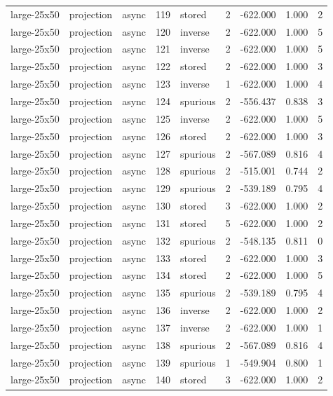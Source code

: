 \begin{tabular}{lllrlrrrr}
large-25x50 & projection & async & 119 & stored & 2 & -622.000 & 1.000 & 2 \\
large-25x50 & projection & async & 120 & inverse & 2 & -622.000 & 1.000 & 5 \\
large-25x50 & projection & async & 121 & inverse & 2 & -622.000 & 1.000 & 5 \\
large-25x50 & projection & async & 122 & stored & 2 & -622.000 & 1.000 & 3 \\
large-25x50 & projection & async & 123 & inverse & 1 & -622.000 & 1.000 & 4 \\
large-25x50 & projection & async & 124 & spurious & 2 & -556.437 & 0.838 & 3 \\
large-25x50 & projection & async & 125 & inverse & 2 & -622.000 & 1.000 & 5 \\
large-25x50 & projection & async & 126 & stored & 2 & -622.000 & 1.000 & 3 \\
large-25x50 & projection & async & 127 & spurious & 2 & -567.089 & 0.816 & 4 \\
large-25x50 & projection & async & 128 & spurious & 2 & -515.001 & 0.744 & 2 \\
large-25x50 & projection & async & 129 & spurious & 2 & -539.189 & 0.795 & 4 \\
large-25x50 & projection & async & 130 & stored & 3 & -622.000 & 1.000 & 2 \\
large-25x50 & projection & async & 131 & stored & 5 & -622.000 & 1.000 & 2 \\
large-25x50 & projection & async & 132 & spurious & 2 & -548.135 & 0.811 & 0 \\
large-25x50 & projection & async & 133 & stored & 2 & -622.000 & 1.000 & 3 \\
large-25x50 & projection & async & 134 & stored & 2 & -622.000 & 1.000 & 5 \\
large-25x50 & projection & async & 135 & spurious & 2 & -539.189 & 0.795 & 4 \\
large-25x50 & projection & async & 136 & inverse & 2 & -622.000 & 1.000 & 2 \\
large-25x50 & projection & async & 137 & inverse & 2 & -622.000 & 1.000 & 1 \\
large-25x50 & projection & async & 138 & spurious & 2 & -567.089 & 0.816 & 4 \\
large-25x50 & projection & async & 139 & spurious & 1 & -549.904 & 0.800 & 1 \\
large-25x50 & projection & async & 140 & stored & 3 & -622.000 & 1.000 & 2 \\

\end{tabular}
